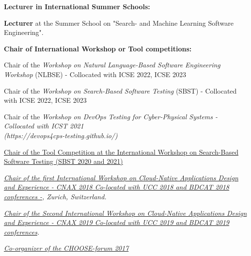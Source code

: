 \documentclass[10pt]{article}
\begin{document}
\textbf{Lecturer in International Summer Schools:}
\begin{innerlist}
\item \textbf{Lecturer} at the Summer School on "Search- and Machine Learning Software Engineering". 
\end{innerlist}




\textbf{Chair of International Workshop or Tool competitions:}
\begin{innerlist}
\item Chair of the \textit{Workshop on Natural Language-Based Software Engineering Workshop} (NLBSE) - Collocated with ICSE 2022, ICSE 2023
\item Chair of  the \textit{Workshop on Search-Based Software Testing} (SBST) - Collocated with ICSE 2022, ICSE 2023
\item Chair of the \textit{Workshop on DevOps Testing for Cyber-Physical Systems - Collocated with ICST 2021 \\(https://devops4cps-testing.github.io/)} 
\item \href{}
{Chair of the Tool Competition at the 
International Workshop on Search-Based Software Testing (SBST 2020 and 2021)} 
       \item \emph{\href{http://cnax.servicelaboratory.ch/}
                   {\textit{Chair of the first International Workshop on Cloud-Native Applications Design and Experience - CNAX 2018
Co-located with UCC 2018 and BDCAT 2018 conferences -}}, Zurich, Switzerland.}

       \item \emph{\href{}
                   {\textit{Chair of the Second International Workshop on Cloud-Native Applications Design and Experience - CNAX 2019
Co-located with UCC 2019 and BDCAT 2019 conferences}}.}
\item \textit{\href{http://www.choose.s-i.ch/events/forum2017/index.html}{Co-organizer of the CHOOSE-forum 2017}} 
\end{innerlist}
\end{document}
